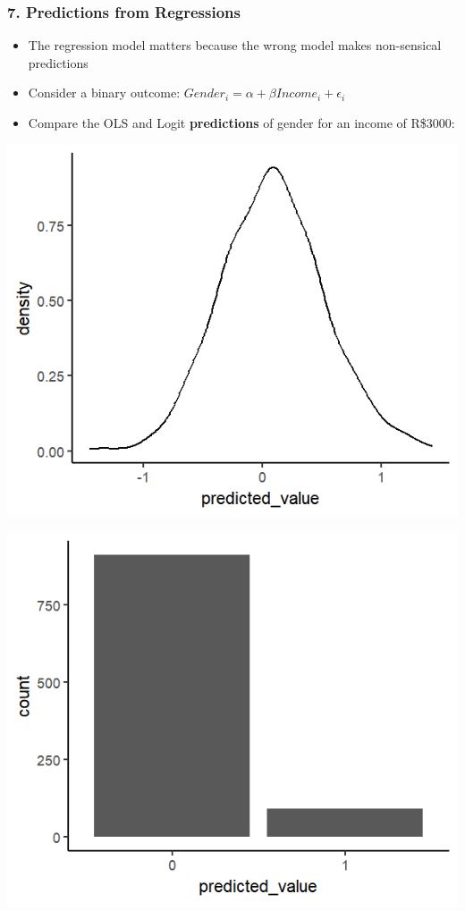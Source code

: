\documentclass[xcolor=x11names,compress]{beamer}\usepackage[]{graphicx}\usepackage[]{color}
\makeatletter
\def\maxwidth{ %
  \ifdim\Gin@nat@width>\linewidth
    \linewidth
  \else
    \Gin@nat@width
  \fi
}
\newenvironment{knitrout}{}{} %
\renewcommand{\(}{\begin{columns}}
\renewcommand{\)}{\end{columns}}
\newcommand{\<}[1]{\begin{column}{#1}}
\renewcommand{\>}{\end{column}}
\makeatother
\begin{document}
\begin{frame}
\frametitle{7. Predictions from Regressions}
\begin{itemize}
\item The regression model matters because the wrong model makes non-sensical predictions
\item Consider a binary outcome: $Gender_i = \alpha + \beta Income_i + \epsilon_i$
\item Compare the OLS and Logit \textbf{predictions} of gender for an income of R\$3000:
\end{itemize}
\begin{multicols}{2}
\begin{knitrout}
\color{fgcolor}
\includegraphics[width=\maxwidth]{figure/preds_1_ols_chart-1} 

\end{knitrout}
\columnbreak
\begin{knitrout}
\color{fgcolor}
\includegraphics[width=\maxwidth]{figure/preds_1_logit_chart-1} 


\end{knitrout}
\end{multicols}
\end{frame}
\end{document}
